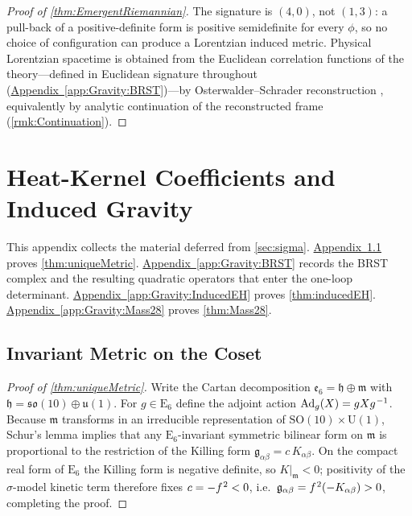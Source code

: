 \documentclass[pdflatex,sn-mathphys-num]{sn-jnl}
\theoremstyle{thmstyleone}
\theoremstyle{thmstyletwo}%
\theoremstyle{thmstylethree}%
\newcommand{\SO}[1]{\mathrm{SO(#1)}}
\newcommand{\U}[1]{\mathrm{U(#1)}}
\newcommand{\E}[1]{\mathrm{E_{#1}}}
\newcommand{\SOTen}{\SO{10}}
\newcommand{\UOne}{\U{1}}
\newcommand{\ESix}{\E{6}}
\newcommand{\SOTenXUOne}{\SOTen \times \UOne}
\newcommand{\sm}{\hspace{.065em}}
\newcommand{\appref}[1]{\hyperref[#1]{Appendix~\ref*{#1}}}
\newcommand{\smexp}[1]{^{\sm #1}}
\begin{document}
\begin{appendices}
\begin{proof}[Proof of \autoref{thm:EmergentRiemannian}]
The signature is \((4,0)\), not \((1,3)\): a pull-back of a positive-definite
form is positive semidefinite for every \(\phi\), so no choice of configuration
can produce a Lorentzian induced metric. Physical Lorentzian spacetime is
obtained from the Euclidean correlation functions of the theory---defined in
Euclidean signature throughout (\appref{app:Gravity:BRST})---by
Osterwalder--Schrader reconstruction \cite{GlimmJaffe:1987}, equivalently by
analytic continuation of the reconstructed frame
(\autoref{rmk:Continuation}).
\end{proof}

\section{Heat-Kernel Coefficients and Induced Gravity}
\label{app:Gravity}

This appendix collects the material deferred from \autoref{sec:sigma}.  
\appref{app:Gravity:Metric} proves \autoref{thm:uniqueMetric}.  
\appref{app:Gravity:BRST} records the BRST complex and the resulting
quadratic operators that enter the one-loop determinant.  
\appref{app:Gravity:InducedEH} proves \autoref{thm:inducedEH}. \appref{app:Gravity:Mass28} proves \autoref{thm:Mass28}.

\subsection{Invariant Metric on the Coset}
\label{app:Gravity:Metric}

\begin{proof}[Proof of \autoref{thm:uniqueMetric}]
Write the Cartan decomposition $\mathfrak e_{6}=\mathfrak h\oplus\mathfrak m$
with $\mathfrak h=\mathfrak{so}(10)\oplus\mathfrak u(1)$.  For $g\in \ESix$ define the adjoint action $\operatorname{Ad}_{g}(X)=gXg\smexp{-1}$. Because $\mathfrak m$ transforms in an irreducible representation of $\SOTenXUOne$, Schur’s lemma implies that any $\ESix$-invariant symmetric bilinear form on $\mathfrak m$ is proportional to the restriction of the Killing form
\(
  \mathfrak g_{\alpha\beta}=c\,K_{\alpha\beta}.
\)
On the compact real form of $\ESix$ the Killing form is negative definite, so
$K|_{\mathfrak m}<0$; positivity of the $\sigma$-model kinetic term therefore
fixes $c=-f\smexp{2}<0$, i.e.\ $\mathfrak g_{\alpha\beta}=f\smexp{2}(-K_{\alpha\beta})>0$, completing the proof.
\end{proof}


\end{appendices}
\end{document}

